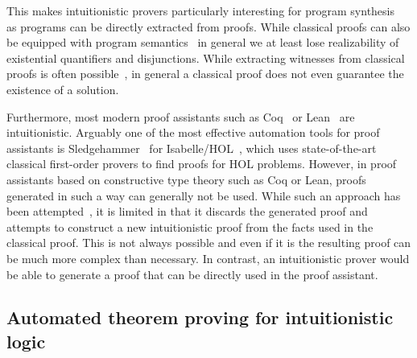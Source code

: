 \documentclass{article}
\theoremstyle{definition}
\theoremstyle{definition}
\theoremstyle{definition}
\theoremstyle{definition}
\theoremstyle{definition}
\theoremstyle{definition}
\theoremstyle{definition}
\newcommand{\0}{\mathbf 0}
\newcommand{\1}{\mathbf 1}
\begin{document}
	This makes intuitionistic provers particularly interesting for program synthesis~\cite{alur2013syntax} as programs can be directly extracted from proofs. While classical proofs can also be equipped with program semantics~\cite{Parigot1,Control1} in general we at least lose realizability of existential quantifiers and disjunctions. While extracting witnesses from classical proofs is often possible~\cite{hozzova2023program}, in general a classical proof does not even guarantee the existence of a solution.
	
	Furthermore, most modern proof assistants such as Coq~\cite{bertot2013interactive} or Lean~\cite{de2015lean} are intuitionistic. Arguably one of the most effective automation tools for proof assistants is Sledgehammer~\cite{bohme2010sledgehammer} for Isabelle/HOL~\cite{nipkow2002isabelle}, which uses state-of-the-art classical first-order provers to find proofs for HOL problems. However, in proof assistants based on constructive type theory such as Coq or Lean, proofs generated in such a way can generally not be used. While such an approach has been attempted~\cite{czajka2018hammer}, it is limited in that it discards the generated proof and attempts to construct a new intuitionistic proof from the facts used in the classical proof. This is not always possible and even if it is the resulting proof can be much more complex than necessary. In contrast, an intuitionistic prover would be able to generate a proof that can be directly used in the proof assistant.

	\subsection{Automated theorem proving for intuitionistic logic}
\end{document}
